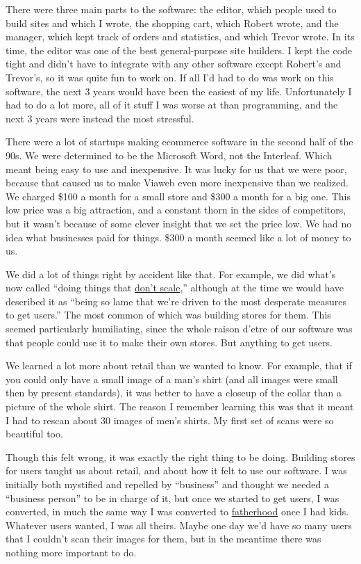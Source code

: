 There were three main parts to the software: the editor, which people
used to build sites and which I wrote, the shopping cart, which Robert
wrote, and the manager, which kept track of orders and statistics, and
which Trevor wrote. In its time, the editor was one of the best
general-purpose site builders. I kept the code tight and didn't have to
integrate with any other software except Robert's and Trevor's, so it
was quite fun to work on. If all I'd had to do was work on this
software, the next 3 years would have been the easiest of my life.
Unfortunately I had to do a lot more, all of it stuff I was worse at
than programming, and the next 3 years were instead the most stressful.

There were a lot of startups making ecommerce software in the second
half of the 90s. We were determined to be the Microsoft Word, not the
Interleaf. Which meant being easy to use and inexpensive. It was lucky
for us that we were poor, because that caused us to make Viaweb even
more inexpensive than we realized. We charged \$100 a month for a small
store and \$300 a month for a big one. This low price was a big
attraction, and a constant thorn in the sides of competitors, but it
wasn't because of some clever insight that we set the price low. We had
no idea what businesses paid for things. \$300 a month seemed like a lot
of money to us.

We did a lot of things right by accident like that. For example, we did
what's now called ``doing things that \href{ds.html}{don't scale},''
although at the time we would have described it as ``being so lame that
we're driven to the most desperate measures to get users.'' The most
common of which was building stores for them. This seemed particularly
humiliating, since the whole raison d'etre of our software was that
people could use it to make their own stores. But anything to get users.

We learned a lot more about retail than we wanted to know. For example,
that if you could only have a small image of a man's shirt (and all
images were small then by present standards), it was better to have a
closeup of the collar than a picture of the whole shirt. The reason I
remember learning this was that it meant I had to rescan about 30 images
of men's shirts. My first set of scans were so beautiful too.

Though this felt wrong, it was exactly the right thing to be doing.
Building stores for users taught us about retail, and about how it felt
to use our software. I was initially both mystified and repelled by
``business'' and thought we needed a ``business person'' to be in charge
of it, but once we started to get users, I was converted, in much the
same way I was converted to \href{kids.html}{fatherhood} once I had
kids. Whatever users wanted, I was all theirs. Maybe one day we'd have
so many users that I couldn't scan their images for them, but in the
meantime there was nothing more important to do.

